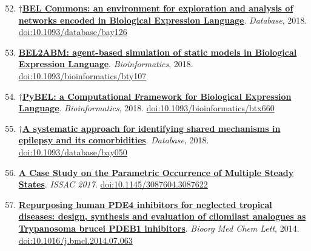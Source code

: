 \documentclass[10pt,a4paper,sans]{moderncv} %
\newcommand{\wikidata}[2]{\href{https://bioregistry.io/wikidata:#1?provider=scholia}{{#2}}}
\begin{document}
    \begin{enumerate}
    \setcounter{enumi}{51}
    \itemsep0.5em
        \item
        $\dagger$\wikidata{Q60302045}{\textbf{BEL Commons: an environment for exploration and analysis of networks encoded in Biological Expression Language}}.
    \textit{Database}, 2018.  {\scriptsize \href{https://bioregistry.io/doi:10.1093/DATABASE/BAY126}{doi:10.1093/database/bay126}}
        \item
        \wikidata{Q51056857}{\textbf{BEL2ABM: agent-based simulation of static models in Biological Expression Language}}.
    \textit{Bioinformatics}, 2018.  {\scriptsize \href{https://bioregistry.io/doi:10.1093/BIOINFORMATICS/BTY107}{doi:10.1093/bioinformatics/bty107}}
        \item
        $\dagger$\wikidata{Q42695788}{\textbf{PyBEL: a Computational Framework for Biological Expression Language}}.
    \textit{Bioinformatics}, 2018.  {\scriptsize \href{https://bioregistry.io/doi:10.1093/BIOINFORMATICS/BTX660}{doi:10.1093/bioinformatics/btx660}}
        \item
        $\dagger$\wikidata{Q55315340}{\textbf{A systematic approach for identifying shared mechanisms in epilepsy and its comorbidities}}.
    \textit{Database}, 2018.  {\scriptsize \href{https://bioregistry.io/doi:10.1093/DATABASE/BAY050}{doi:10.1093/database/bay050}}
    \end{enumerate}
    \begin{enumerate}
    \setcounter{enumi}{55}
    \itemsep0.5em
        \item
        \wikidata{Q47479157}{\textbf{A Case Study on the Parametric Occurrence of Multiple Steady States}}.
    \textit{ISSAC 2017}.  {\scriptsize \href{https://bioregistry.io/doi:10.1145/3087604.3087622}{doi:10.1145/3087604.3087622}}
    \end{enumerate}
    \begin{enumerate}
    \setcounter{enumi}{56}
    \itemsep0.5em
        \item
        \wikidata{Q34138086}{\textbf{Repurposing human PDE4 inhibitors for neglected tropical diseases: design, synthesis and evaluation of cilomilast analogues as Trypanosoma brucei PDEB1 inhibitors}}.
    \textit{Bioorg Med Chem Lett}, 2014.  {\scriptsize \href{https://bioregistry.io/doi:10.1016/J.BMCL.2014.07.063}{doi:10.1016/j.bmcl.2014.07.063}}
    \end{enumerate}
\end{document}
